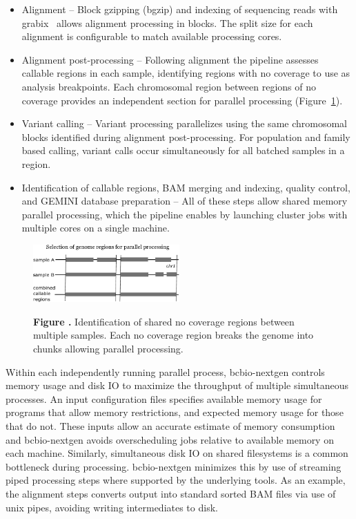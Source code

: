 \documentclass{frontiersSCNS}
\begin{document}
\begin{itemize}
  \item Alignment -- Block gzipping (bgzip) and indexing of sequencing reads with
    grabix~\citep{grabix} allows alignment processing in blocks. The split size
    for each alignment is configurable to match available processing cores.
  \item Alignment post-processing -- Following alignment the pipeline assesses
    callable regions in each sample, identifying regions with no coverage to use
    as analysis breakpoints. Each chromosomal region between regions of no coverage
    provides an independent section for parallel processing (Figure~\ref{fig:03}).
  \item Variant calling -- Variant processing parallelizes using the same
    chromosomal blocks identified during alignment post-processing. For
    population and family based calling, variant calls occur simultaneously for
    all batched samples in a region.
  \item Identification of callable regions, BAM merging and indexing, quality
    control, and GEMINI database preparation -- All of these steps allow shared
    memory parallel processing, which the pipeline enables by launching cluster
    jobs with multiple cores on a single machine.
\end{itemize}

\begin{figure}[tbp]
\begin{center}
\includegraphics[width=0.5\textwidth]{parallel-genome}
\end{center}
 \textbf{\label{fig:03} Figure .}{
   Identification of shared no coverage regions between multiple samples. Each
   no coverage region breaks the genome into chunks allowing parallel processing.}
\end{figure}

Within each independently running parallel process, bcbio-nextgen controls
memory usage and disk IO to maximize the throughput of multiple simultaneous
processes.  An input configuration files specifies available memory usage for
programs that allow memory restrictions, and expected memory usage for those
that do not. These inputs allow an accurate estimate of memory consumption and
bcbio-nextgen avoids overscheduling jobs relative to available memory on each
machine. Similarly, simultaneous disk IO on shared filesystems is a common
bottleneck during processing. bcbio-nextgen minimizes this by use of streaming
piped processing steps where supported by the underlying tools. As an example,
the alignment steps converts output into standard sorted BAM files via use of
unix pipes, avoiding writing intermediates to disk.
\end{document}
